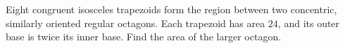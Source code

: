 Eight congruent isosceles trapezoids form the region between two concentric, similarly oriented regular octagons. Each trapezoid has area $24$, and its outer base is twice its inner base. Find the area of the larger octagon.
